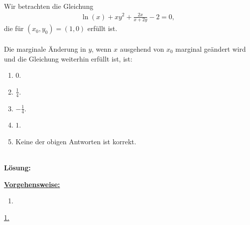 \newpage

\subsection*{}
Wir betrachten die Gleichung
\begin{align*}
	\ln(x) + x y^2 + \frac{2x}{x + 2y} - 2 = 0,
\end{align*}
die für $(x_0,y_0) = (1,0)$ erfüllt ist.\\
\\
Die marginale Änderung in $y$, wenn $x$ ausgehend von $x_0$ marginal geändert wird und die Gleichung weiterhin erfüllt ist, ist:
\renewcommand{\labelenumi}{(\alph{enumi})}
\begin{enumerate}
	\item 
	$ 0 $.
	\item
	$ \frac{1}{4}$.
	\item
	$ -\frac{1}{4}$.
	\item
	$ 1$.
	\item
	Keine der obigen Antworten ist korrekt.
\end{enumerate}
\ \\
\textbf{Lösung:}
\begin{mdframed}
\underline{\textbf{Vorgehensweise:}}
\renewcommand{\labelenumi}{\theenumi.}
\begin{enumerate}
\item 
\end{enumerate}
\end{mdframed}

\underline{1. }\\





\newpage

